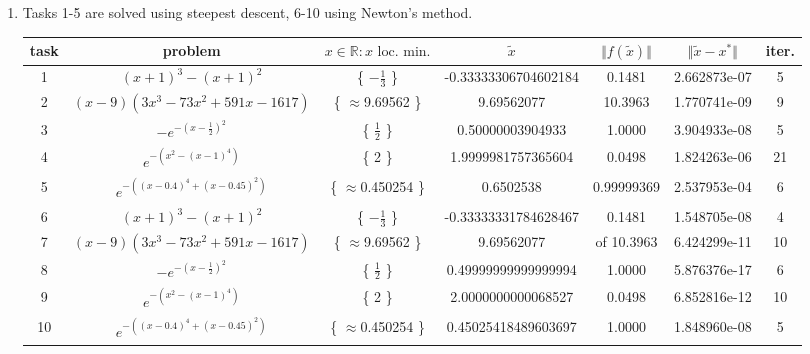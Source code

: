 \documentclass[12pt, a4paper, parskip=half]{scrartcl}
\newcommand{\problem}{\clearpage\item}
\begin{document}
\begin{enumerate}[leftmargin=0.5cm, label=(\roman*)]
        \problem %
        Tasks 1-5 are solved using steepest descent, 6-10 using Newton's method.
        \begin{table}[!ht]
            \begin{adjustbox}{angle=90}
                \begin{tabular}{|| c | c | c | c | c | c | c ||} 
                    \hline
                    task & problem & $x \in \mathbb{R} : x \text{ loc. min.}$ & $\tilde{x}$ & $\Vert f(\tilde{x}) \Vert$ & $\Vert \tilde{x} - x^* \Vert$ & iter. \\ [0.5ex] 
                    \hline\hline
                    1 & \footnotesize $(x+1)^3 - (x+1)^2$ & \{ $-\frac{1}{3}$ \} & \footnotesize -0.33333306704602184 & 0.1481 & 2.662873e-07 & 5 \\
                    \hline
                    2 & \footnotesize $(x-9)(3x^3-73x^2+591x-1617)$ \normalsize & \{ $\approx$9.69562 \} & 9.69562077 & 10.3963 & 1.770741e-09 & 9 \\
                    \hline
                    3 & \footnotesize $-e^{-(x-\frac{1}{2})^2}$ & \{ $\frac{1}{2}$ \} & \footnotesize 0.50000003904933 & 1.0000 & 3.904933e-08 & 5 \\
                    \hline
                    4 & \footnotesize $e^{-(x^2 - (x-1)^4)}$ & \{ 2 \} & \footnotesize 1.9999981757365604 & 0.0498 & 1.824263e-06 & 21 \\
                    \hline
                    5 & \footnotesize $e^{-((x-0.4)^4 + (x-0.45)^2)}$ & \{ $\approx$0.450254 \} & \footnotesize 0.6502538 & 0.99999369 & 2.537953e-04 & 6 \\
                    \hline\hline
                    6 & \footnotesize $(x+1)^3 - (x+1)^2$ & \{ $-\frac{1}{3}$ \} & \footnotesize -0.33333331784628467 & 0.1481 & 1.548705e-08 & 4 \\
                    \hline
                    7 & \footnotesize $(x-9)(3x^3-73x^2+591x-1617)$ \normalsize & \{ $\approx$9.69562 \} & \footnotesize 9.69562077 & of 10.3963 & 6.424299e-11 & 10 \\
                    \hline
                    8 & \footnotesize $-e^{-(x-\frac{1}{2})^2}$ & \{ $\frac{1}{2}$ \} & \footnotesize 0.49999999999999994 & 1.0000 & 5.876376e-17 & 6 \\
                    \hline
                    9 & \footnotesize $e^{-(x^2 - (x-1)^4)}$ & \{ 2 \} & \footnotesize 2.0000000000068527 & 0.0498 & 6.852816e-12 & 10 \\
                    \hline
                    10 & \footnotesize $e^{-((x-0.4)^4 + (x-0.45)^2)}$ & \{ $\approx$0.450254 \} & \footnotesize 0.45025418489603697 & 1.0000 & 1.848960e-08 & 5 \\ [1ex] 
                    \hline
                \end{tabular}
            \end{adjustbox}
        \end{table}
        

\end{enumerate}
\end{document}

